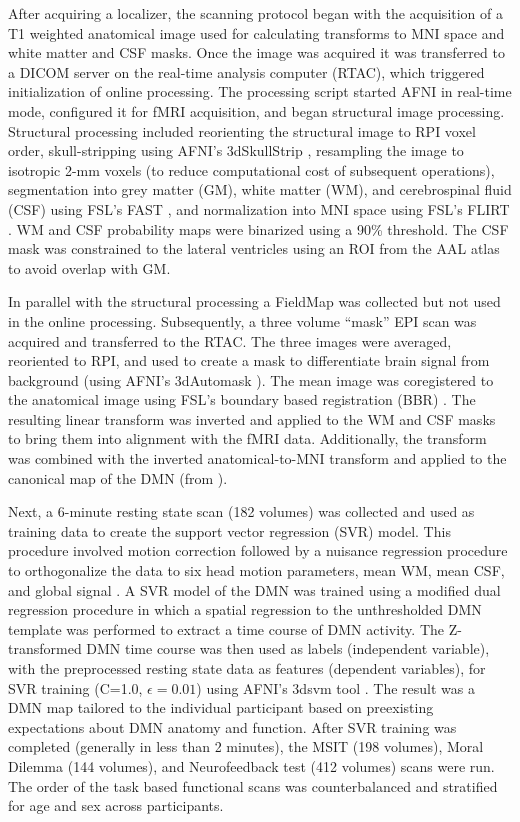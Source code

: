 After acquiring a localizer, the scanning protocol began with the acquisition of a T1 weighted anatomical image used for calculating transforms to MNI space and white matter and CSF masks. Once the image was acquired it was transferred to a DICOM server on the real-time analysis computer (RTAC), which triggered initialization of online processing. The processing script started AFNI in real-time mode, configured it for fMRI acquisition, and began structural image processing. Structural processing included reorienting the structural image to RPI voxel order, skull-stripping using AFNI’s 3dSkullStrip \cite{Cox1996}, resampling the image to isotropic 2-mm voxels (to reduce computational cost of subsequent operations), segmentation into grey matter (GM), white matter (WM), and cerebrospinal fluid (CSF) using FSL’s FAST \cite{Zhang2001}, and normalization into MNI space using FSL’s FLIRT \cite{Jenkinson2002,Jenkinson2001}. WM and CSF probability maps were binarized using a 90\% threshold. The CSF mask was constrained to the lateral ventricles using an ROI from the AAL atlas to avoid overlap with GM.

In parallel with the structural processing a FieldMap was collected but not used in the online processing. Subsequently, a three volume “mask” EPI scan was acquired and transferred to the RTAC. The three images were averaged, reoriented to RPI, and used to create a mask to differentiate brain signal from background (using AFNI’s 3dAutomask \cite{Cox1996}). The mean image was coregistered to the anatomical image using FSL’s boundary based registration (BBR) \cite{Greve2009}. The resulting linear transform was inverted and applied to the WM and CSF masks to bring them into alignment with the fMRI data. Additionally, the transform was combined with the inverted anatomical-to-MNI transform and applied to the canonical map of the DMN (from \cite{Smith2009}).

Next, a 6-minute resting state scan (182 volumes) was collected and used as training data to create the support vector regression (SVR) model. This procedure involved motion correction followed by a nuisance regression procedure to orthogonalize the data to six head motion parameters, mean WM, mean CSF, and global signal \cite{Friston1996,Fox2005,Lund2006}. A SVR model of the DMN was trained using a modified dual regression procedure in which a spatial regression to the unthresholded DMN template was performed to extract a time course of DMN activity. The Z-transformed DMN time course was then used as labels (independent variable), with the preprocessed resting state data as features (dependent variables), for SVR training (C=1.0, $\epsilon = 0.01$) using AFNI’s 3dsvm tool \cite{LaConte2005}. The result was a DMN map tailored to the individual participant based on preexisting expectations about DMN anatomy and function. After SVR training was completed (generally in less than 2 minutes), the MSIT (198 volumes), Moral Dilemma (144 volumes), and Neurofeedback test (412 volumes) scans were run. The order of the task based functional scans was counterbalanced and stratified for age and sex across participants.

